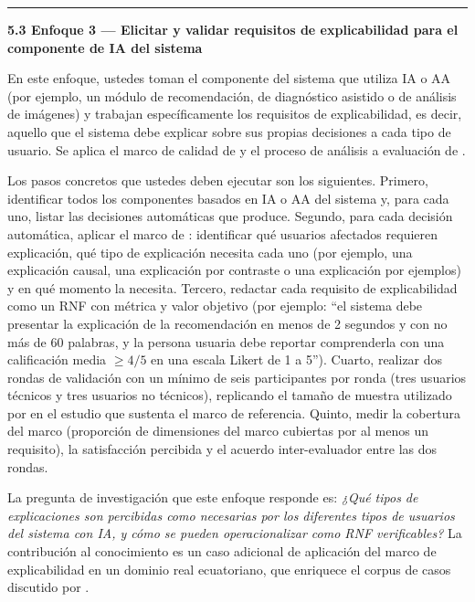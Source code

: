 \documentclass[11pt,a4paper]{article}
\newcommand{\submark}[1]{\par\vspace{4pt}\noindent
    {\color{uteqgreen}\rule[-1pt]{3.5pt}{12pt}}\hspace{6pt}\textbf{\color{uteqgreen}#1}\par\vspace{2pt}}
\begin{document}
\submark{5.3 Enfoque 3 --- Elicitar y validar requisitos de explicabilidad para el componente de IA del sistema}
En este enfoque, ustedes toman el componente del sistema que utiliza IA o AA (por ejemplo, un módulo de recomendación, de diagnóstico asistido o de análisis de imágenes) y trabajan específicamente los requisitos de explicabilidad, es decir, aquello que el sistema debe explicar sobre sus propias decisiones a cada tipo de usuario.
Se aplica el marco de calidad de \cite{chazette2021exploring} y el proceso de análisis a evaluación de \cite{chazette2022explainable}.

Los pasos concretos que ustedes deben ejecutar son los siguientes.
Primero, identificar todos los componentes basados en IA o AA del sistema y, para cada uno, listar las decisiones automáticas que produce.
Segundo, para cada decisión automática, aplicar el marco de \cite{chazette2020nfr}: identificar qué usuarios afectados requieren explicación, qué tipo de explicación necesita cada uno (por ejemplo, una explicación causal, una explicación por contraste o una explicación por ejemplos) y en qué momento la necesita.
Tercero, redactar cada requisito de explicabilidad como un RNF con métrica y valor objetivo (por ejemplo: ``el sistema debe presentar la explicación de la recomendación en menos de 2 segundos y con no más de 60 palabras, y la persona usuaria debe reportar comprenderla con una calificación media $\geq 4/5$ en una escala Likert de 1 a 5'').
Cuarto, realizar dos rondas de validación con un mínimo de seis participantes por ronda (tres usuarios técnicos y tres usuarios no técnicos), replicando el tamaño de muestra utilizado por \cite{chazette2022explainable} en el estudio que sustenta el marco de referencia.
Quinto, medir la cobertura del marco (proporción de dimensiones del marco cubiertas por al menos un requisito), la satisfacción percibida y el acuerdo inter-evaluador entre las dos rondas.

La pregunta de investigación que este enfoque responde es: \emph{¿Qué tipos de explicaciones son percibidas como necesarias por los diferentes tipos de usuarios del sistema con IA, y cómo se pueden operacionalizar como RNF verificables?}
La contribución al conocimiento es un caso adicional de aplicación del marco de explicabilidad en un dominio real ecuatoriano, que enriquece el corpus de casos discutido por \cite{chazette2022explainable}.
\end{document}
